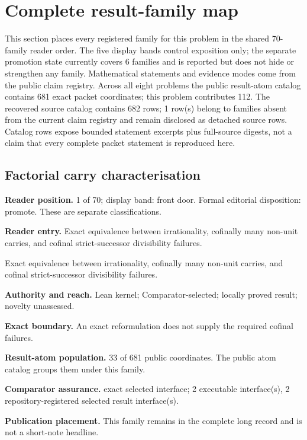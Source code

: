 \documentclass[11pt]{article}
\begin{document}
\section{Complete result-family map}\label{sec:erdos-68-complete-family-map}

This section places every registered family for this problem in the shared 70-family reader order.  The five display bands control exposition only; the separate promotion state currently covers 6 families and is reported but does not hide or strengthen any family.  Mathematical statements and evidence modes come from the public claim registry.  Across all eight problems the public result-atom catalog contains 681 exact packet coordinates; this problem contributes 112.  The recovered source catalog contains 682 rows; 1 row(s) belong to families absent from the current claim registry and remain disclosed as detached source rows.  Catalog rows expose bounded statement excerpts plus full-source digests, not a claim that every complete packet statement is reproduced here.

\subsection{Factorial carry characterisation}
\textbf{Reader position.} 1 of 70; display band: front door.  Formal editorial disposition: promote.  These are separate classifications.

\textbf{Reader entry.} Exact equivalence between irrationality, cofinally many non-unit carries, and cofinal strict-successor divisibility failures.

Exact equivalence between irrationality, cofinally many non-unit carries, and cofinal strict-successor divisibility failures.

\textbf{Authority and reach.} Lean kernel; Comparator-selected; locally proved result; novelty unassessed.

\textbf{Exact boundary.} An exact reformulation does not supply the required cofinal failures.

\textbf{Result-atom population.} 33 of 681 public coordinates. The public atom catalog groups them under this family.

\textbf{Comparator assurance.} exact selected interface; 2 executable interface(s), 2 repository-registered selected result interface(s).

\textbf{Publication placement.} This family remains in the complete long record and is not a short-note headline.
\end{document}
